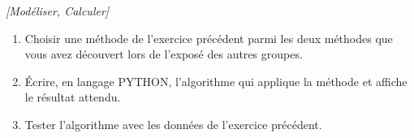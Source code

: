 \exo \textit{[Modéliser, Calculer]}

\begin{enumerate}
\item Choisir une méthode de l'exercice précédent parmi les deux méthodes que vous avez découvert lors de l'exposé des autres groupes.
\item Écrire, en langage PYTHON, l'algorithme qui applique la méthode et affiche le résultat attendu.
\item Tester l'algorithme avec les données de l'exercice précédent.
\end{enumerate}







